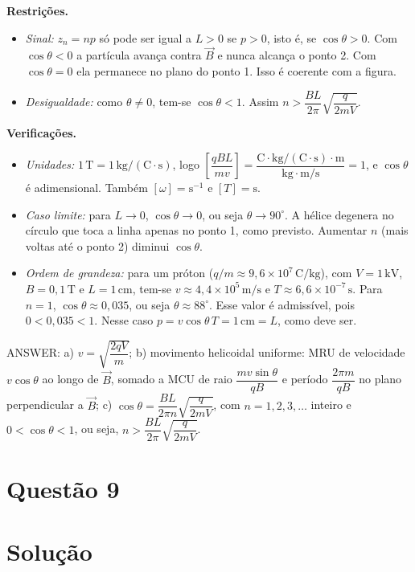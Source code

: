 \documentclass{article}%
\begin{document}
\textbf{Restrições.}
\begin{itemize}
\item \textit{Sinal:} $z_n=np$ só pode ser igual a $L>0$ se $p>0$, isto é, se $\cos\theta>0$. Com $\cos\theta<0$ a partícula avança contra $\vec{B}$ e nunca alcança o ponto 2. Com $\cos\theta=0$ ela permanece no plano do ponto 1. Isso é coerente com a figura.
\item \textit{Desigualdade:} como $\theta\neq 0$, tem-se $\cos\theta<1$. Assim $n>\dfrac{BL}{2\pi}\sqrt{\dfrac{q}{2mV}}$.
\end{itemize}

\textbf{Verificações.}
\begin{itemize}
\item \textit{Unidades:} $1\,\mathrm{T}=1\,\mathrm{kg/(C\cdot s)}$, logo $\left[\dfrac{qBL}{mv}\right]=\dfrac{\mathrm{C}\cdot\mathrm{kg/(C\cdot s)}\cdot\mathrm{m}}{\mathrm{kg\cdot m/s}}=1$, e $\cos\theta$ é adimensional. Também $[\omega]=\mathrm{s}^{-1}$ e $[T]=\mathrm{s}$.
\item \textit{Caso limite:} para $L\to 0$, $\cos\theta\to 0$, ou seja $\theta\to 90^\circ$. A hélice degenera no círculo que toca a linha apenas no ponto 1, como previsto. Aumentar $n$ (mais voltas até o ponto 2) diminui $\cos\theta$.
\item \textit{Ordem de grandeza:} para um próton ($q/m\approx 9{,}6\times 10^{7}\,\mathrm{C/kg}$), com $V=1\,\mathrm{kV}$, $B=0{,}1\,\mathrm{T}$ e $L=1\,\mathrm{cm}$, tem-se $v\approx 4{,}4\times 10^{5}\,\mathrm{m/s}$ e $T\approx 6{,}6\times 10^{-7}\,\mathrm{s}$. Para $n=1$, $\cos\theta\approx 0{,}035$, ou seja $\theta\approx 88^\circ$. Esse valor é admissível, pois $0<0{,}035<1$. Nesse caso $p=v\cos\theta\,T=1\,\mathrm{cm}=L$, como deve ser.
\end{itemize}

ANSWER: a) $v=\sqrt{\dfrac{2qV}{m}}$; b) movimento helicoidal uniforme: MRU de velocidade $v\cos\theta$ ao longo de $\vec{B}$, somado a MCU de raio $\dfrac{mv\sin\theta}{qB}$ e período $\dfrac{2\pi m}{qB}$ no plano perpendicular a $\vec{B}$; c) $\cos\theta=\dfrac{BL}{2\pi n}\sqrt{\dfrac{q}{2mV}}$, com $n=1,2,3,\dots$ inteiro e $0<\cos\theta<1$, ou seja, $n>\dfrac{BL}{2\pi}\sqrt{\dfrac{q}{2mV}}$.%
\newpage%
\section*{Questão 9}

\section*{Solução}
\end{document}
